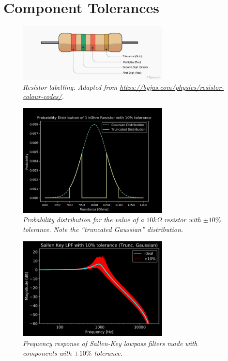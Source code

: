 \documentclass[twoside,a4paper]{article}
\begin{document}
\section{Component Tolerances} \label{sec:tol}
%
\begin{figure}[h]
    \center
    \includegraphics[width=3in]{../CMTolerance/Pics/resistor.png}
    \caption{\label{ResistorLabel}{\it Resistor labelling. Adapted
            from \url{https://byjus.com/physics/resistor-colour-codes/}.}}
\end{figure}
%
\begin{figure}[h]
    \center
    \includegraphics[width=3in]{../CMTolerance/Pics/tgauss_pdf_better.png}
    \caption{\label{trunc_guass}{\it Probability distribution for the
            value of a $10 k\Omega$ resistor with $\pm 10\%$ tolerance.
            Note the ``truncated Gaussian'' distribution.}}
\end{figure}
%
\begin{figure}[h]
    \center
    \includegraphics[width=3in]{../CMTolerance/Pics/lpf_tgauss_plot.png}
    \caption{\label{tol_LPF}{\it Frequency response of Sallen-Key lowpass
            filters made with components with $\pm 10\%$ tolerance.}}
\end{figure}
\end{document}
